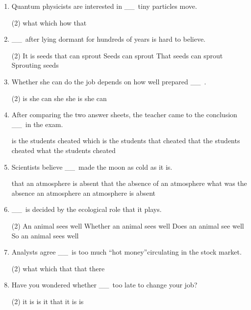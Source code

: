 \documentclass{yufa}
\newcommand\ttu{ \_\_\ }
\begin{document}
\begin{enumerate}
\item Quantum physicists are interested in \ttu tiny particles move.
\begin{tasks}(2)
  \task what
  \task which
  \task how
  \task that
\end{tasks}

\item \ttu after lying dormant for hundreds of years is hard to believe.
\begin{tasks}(2)
  \task It is seeds that can sprout
  \task Seeds can sprout
  \task That seeds can sprout
  \task Sprouting seeds
\end{tasks}

\item Whether she can do the job depends on how well prepared \ttu.
\begin{tasks}(2)
  \task is she
  \task can she
  \task she is
  \task she can
\end{tasks}

\item After comparing the two answer sheets, the teacher came to the conclusion \ttu in the exam.
\begin{tasks}
  \task is the students cheated
  \task which is the students that cheated
  \task that the students cheated
  \task what the students cheated
\end{tasks}

\item Scientists believe \ttu made the moon as cold as it is.
\begin{tasks}
  \task that an atmosphere is absent
  \task that the absence of an atmosphere
  \task what was the absence an atmosphere
  \task an atmosphere is absent
\end{tasks}

\item \ttu is decided by the ecological role that it plays.
\begin{tasks}(2)
  \task An animal sees well
  \task Whether an animal sees well
  \task Does an animal see well
  \task So an animal sees well
\end{tasks}

\item Analysts agree \ttu is too much “hot money”circulating in the stock market.
\begin{tasks}(2)
  \task what
  \task which
  \task that
  \task that there
\end{tasks}

\item Have you wondered whether \ttu too late to change your job?
\begin{tasks}(2)
  \task it is
  \task is it
  \task that it is
  \task is
\end{tasks}


\end{enumerate}
\end{document}
